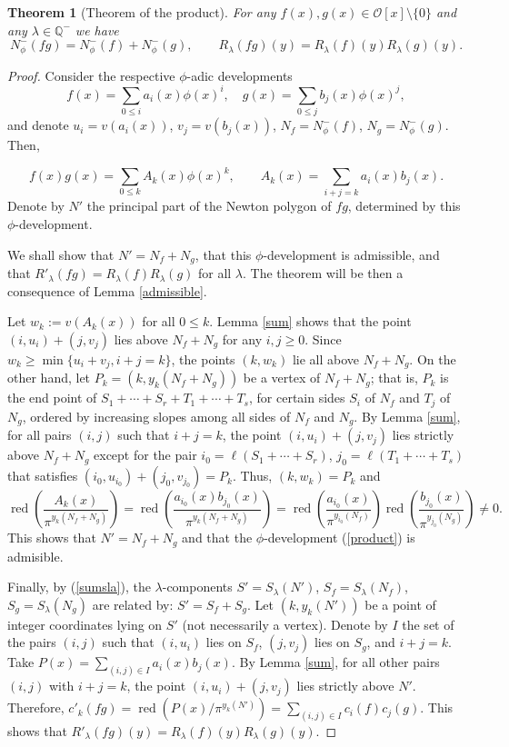 \documentclass{amsart}
\newtheorem{theorem}{Theorem}[section]
\newcommand{\Q}{\mathbb Q}
\def\op{\operatorname}
\def\la{\lambda}
\def\npp#1{N_{\phi}^-(#1)}
\def\oo{{\mathcal O}}
\def\rd{\op{red}}
\def\zpx{\oo[x]}
\begin{document}
\begin{theorem}[Theorem of the product] For any $f(x),g(x)\in\zpx\setminus\{0\}$ and any $\la\in\Q^-$ we have
 $$\npp{fg}=\npp{f}+\npp{g},\qquad R_{\la}(fg)(y)=R_{\la}(f)(y)R_{\la}(g)(y).$$
\end{theorem}

\begin{proof}
Consider the respective $\phi$-adic developments
$$
f(x)=\sum_{0\le i}a_i(x)\phi(x)^i,\quad
g(x)=\sum_{0\le j}b_j(x)\phi(x)^j,
$$and denote $u_i=v(a_i(x))$, $v_j=v(b_j(x))$, $N_f=\npp{f}$, $N_g=\npp{g}$. Then,

\begin{equation}\label{product}
f(x)g(x)=\sum_{0\le k}A_k(x)\phi(x)^k,\qquad
A_k(x)=\sum_{i+j=k}a_i(x)b_j(x).
\end{equation}
Denote by $N'$ the principal part of the Newton polygon of $fg$, determined by this $\phi$-development.

We shall show that $N'=N_f+N_g$, that this $\phi$-development is admissible, and that $R'_{\la}(fg)=R_{\la}(f)R_{\la}(g)$ for all $\la$. The theorem will be then a
consequence of Lemma \ref{admissible}.

Let $w_k:=v(A_k(x))$ for all $0\le k$. Lemma
\ref{sum} shows that the point $(i,u_i)+(j,v_j)$ lies above $N_f+N_g$
for any $i,j\ge0$. Since $w_k\ge
\min\{u_i+v_j,i+j=k\}$, the points $(k,w_k)$ lie all above $N_f+N_g$.
On the other hand, let $P_k=(k,y_k(N_f+N_g))$ be a vertex of $N_f+N_g$; that is, $P_k$ is the end point
of $S_1+\cdots+S_r+T_1+\cdots+T_s$, for certain sides $S_i$ of $N_f$ and $T_j$ of $N_g$, ordered by increasing slopes among all sides of $N_f$ and $N_g$. By Lemma \ref{sum}, for all
pairs $(i,j)$ such that $i+j=k$, the point $(i,u_i)+(j,v_j)$ lies
strictly above $N_f+N_g$ except for the pair
$i_0=\ell(S_1+\cdots+S_r)$, $j_0=\ell(T_1+\cdots+T_s)$ that
satisfies $(i_0,u_{i_0})+(j_0,v_{j_0})=P_k$. Thus,
$(k,w_k)=P_k$ and
$$\rd\left(\frac{A_k(x)}{\pi^{y_k(N_f+N_g)}}\right)=\rd\left(\frac{a_{i_0}(x)b_{j_0}(x)}{\pi^{y_k(N_f+N_g)}}
\right)=\rd\left(\frac{a_{i_0}(x)}{\pi^{y_{i_0}(N_f)}}\right)\rd\left(\frac{b_{j_0}(x)}{\pi^{y_{j_0}(N_g)}}\right)\ne0.$$
This shows that $N'=N_f+N_g$ and that the $\phi$-development (\ref{product}) is
admisible.

Finally, by (\ref{sumsla}), the $\la$-components $S'=S_{\la}(N')$, $S_f=S_{\la}(N_f)$, $S_g=S_{\la}(N_g)$ are related by: $S'=S_f+S_g$. Let $(k,y_k(N'))$ be a point of integer coordinates lying on $S'$ (not necessarily a vertex). Denote by $I$ the set of the pairs $(i,j)$ such that $(i,u_i)$ lies on $S_f$, $(j,v_j)$ lies on $S_g$, and $i+j=k$. Take $P(x)=\sum_{(i,j)\in I}a_i(x)b_j(x)$. By Lemma \ref{sum}, for all other pairs $(i,j)$ with $i+j=k$, the point $(i,u_i)+(j,v_j)$ lies strictly above $N'$. Therefore, $c'_k(fg)=\rd(P(x)/\pi^{y_k(N')})=\sum_{(i,j)\in I}c_i(f)c_j(g)$. This shows that $R'_{\la}(fg)(y)=R_{\la}(f)(y)R_{\la}(g)(y)$.
\end{proof}
\end{document}

